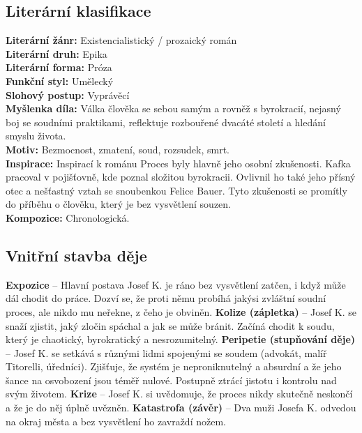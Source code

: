 \documentclass[12pt, a4paper]{article}
\newcommand{\mybf}[1]{\textcolor[RGB]{0, 179, 219}{\textbf{#1}}}
\begin{document}
\subsection*{Literární klasifikace}
\mybf{Literární žánr:} Existencialistický / prozaický román\\[3pt]
\mybf{Literární druh:} Epika\\[3pt]
\mybf{Literární forma:} Próza\\[3pt]
\mybf{Funkční styl:} Umělecký\\[3pt]
\mybf{Slohový postup:} Vyprávěcí\\[10pt]
\mybf{Myšlenka díla:} Válka člověka se sebou samým a rovněž s byrokracií, nejasný boj se soudními praktikami, reflektuje rozbouřené dvacáté století a hledání smyslu života.\\[10pt]
\mybf{Motiv:} Bezmocnost, zmatení, soud, rozsudek, smrt.\\[10pt]
\mybf{Inspirace:} Inspirací k románu Proces byly hlavně jeho osobní zkušenosti. Kafka pracoval v pojišťovně, kde poznal složitou byrokracii. Ovlivnil ho také jeho přísný otec a nešťastný vztah se snoubenkou Felice Bauer. Tyto zkušenosti se promítly do příběhu o člověku, který je bez vysvětlení souzen.\\[10pt]
\mybf{Kompozice:} Chronologická.

\subsection*{Vnitřní stavba děje}
\vspace{0.5em}
\noindent\textbf{Expozice} -- Hlavní postava Josef K. je ráno bez vysvětlení zatčen, i když může dál chodit do práce. Dozví se, že proti němu probíhá jakýsi zvláštní soudní proces, ale nikdo mu neřekne, z čeho je obviněn.
\noindent\textbf{Kolize (zápletka)} -- Josef K. se snaží zjistit, jaký zločin spáchal a jak se může bránit. Začíná chodit k soudu, který je chaotický, byrokratický a nesrozumitelný.
\noindent\textbf{Peripetie (stupňování děje)} -- Josef K. se setkává s různými lidmi spojenými se soudem (advokát, malíř Titorelli, úředníci). Zjišťuje, že systém je neproniknutelný a absurdní a že jeho šance na osvobození jsou téměř nulové. Postupně ztrácí jistotu i kontrolu nad svým životem.
\noindent\textbf{Krize} -- Josef K. si uvědomuje, že proces nikdy skutečně neskončí a že je do něj úplně uvězněn.
\noindent\textbf{Katastrofa (závěr)} -- Dva muži Josefa K. odvedou na okraj města a bez vysvětlení ho zavraždí nožem.
\end{document}
